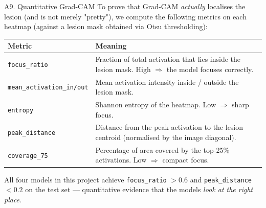 \documentclass[10pt, aspectratio=169]{beamer}
\begin{document}
\begin{frame}{A9. Quantitative Grad-CAM}
    \scriptsize
    To prove that Grad-CAM \textit{actually} localises the lesion (and is not merely "pretty"), we compute the following metrics on each heatmap (against a lesion mask obtained via Otsu thresholding):

    \vspace{0.2cm}
    \begin{table}[]
        \centering
        \begin{tabular}{lp{7.5cm}}
        \toprule
        \rowcolor{usthblue!25} \textbf{Metric} & \textbf{Meaning} \\
        \midrule
        \texttt{focus\_ratio}        & Fraction of total activation that lies inside the lesion mask. High $\Rightarrow$ the model focuses correctly. \\
        \texttt{mean\_activation\_in/out} & Mean activation intensity inside / outside the lesion mask. \\
        \texttt{entropy}             & Shannon entropy of the heatmap. Low $\Rightarrow$ sharp focus. \\
        \texttt{peak\_distance}      & Distance from the peak activation to the lesion centroid (normalised by the image diagonal). \\
        \texttt{coverage\_75}        & Percentage of area covered by the top-25\% activations. Low $\Rightarrow$ compact focus. \\
        \bottomrule
        \end{tabular}
    \end{table}

    \vspace{0.2cm}
    All four models in this project achieve \texttt{focus\_ratio} $> 0.6$ and \texttt{peak\_distance} $< 0.2$ on the test set --- quantitative evidence that the models \textit{look at the right place}.
\end{frame}
\end{document}
